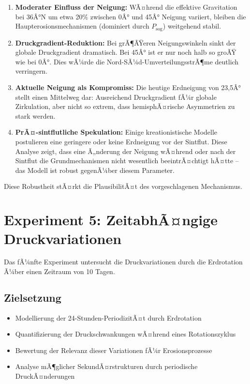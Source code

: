 ﻿\documentclass[12pt,a4paper]{report}
\begin{document}
\begin{enumerate}
	\item \textbf{Moderater Einfluss der Neigung:} WÃ¤hrend die effektive Gravitation bei 36Â°N um etwa 20\% zwischen 0Â° und 45Â° Neigung variiert, bleiben die Haupterosionsmechanismen (dominiert durch $P_{\text{sog}}$) weitgehend stabil.
	
	\item \textbf{Druckgradient-Reduktion:} Bei grÃ¶ÃŸeren Neigungswinkeln sinkt der globale Druckgradient dramatisch. Bei 45Â° ist er nur noch halb so groÃŸ wie bei 0Â°. Dies wÃ¼rde die Nord-SÃ¼d-UmverteilungsstrÃ¶me deutlich verringern.
	
	\item \textbf{Aktuelle Neigung als Kompromiss:} Die heutige Erdneigung von 23,5Â° stellt einen \glqq Mittelweg\grqq{} dar: Ausreichend Druckgradient fÃ¼r globale Zirkulation, aber nicht so extrem, dass hemisphÃ¤rische Asymmetrien zu stark werden.
	
	\item \textbf{PrÃ¤-sintflutliche Spekulation:} Einige kreationistische Modelle postulieren eine geringere oder keine Erdneigung vor der Sintflut. Diese Analyse zeigt, dass eine Ã„nderung der Neigung wÃ¤hrend oder nach der Sintflut die Grundmechanismen nicht wesentlich beeintrÃ¤chtigt hÃ¤tte -- das Modell ist robust gegenÃ¼ber diesem Parameter.
\end{enumerate}

Diese Robustheit stÃ¤rkt die PlausibilitÃ¤t des vorgeschlagenen Mechanismus.

\section{Experiment 5: ZeitabhÃ¤ngige Druckvariationen}

Das fÃ¼nfte Experiment untersucht die Druckvariationen durch die Erdrotation Ã¼ber einen Zeitraum von 10 Tagen.

\subsection{Zielsetzung}

\begin{itemize}
	\item Modellierung der 24-Stunden-PeriodizitÃ¤t durch Erdrotation
	\item Quantifizierung der Druckschwankungen wÃ¤hrend eines Rotationszyklus
	\item Bewertung der Relevanz dieser Variationen fÃ¼r Erosionsprozesse
	\item Analyse mÃ¶glicher SekundÃ¤rstrukturen durch periodische DruckÃ¤nderungen
\end{itemize}
\end{document}
